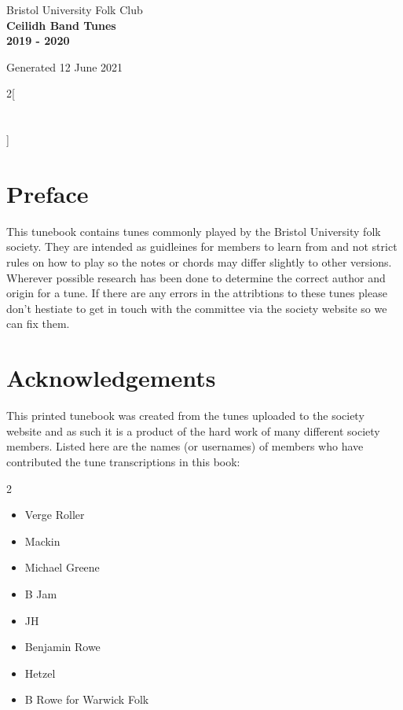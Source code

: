 \documentclass[12pt,a4paper,twoside]{article}
\makeatletter
\newcommand{\thetitle}{Ceilidh Band Tunes \\ \vspace{0.65cm} 2019 - 2020}
\newcommand{\thedate}{12 June 2021}
\renewcommand\tableofcontents{%
    \begin{multicols}{2}[
      \centering
      \section*{\large\contentsname
        \@mkboth{%
           \MakeUppercase\contentsname}{\MakeUppercase\contentsname}}]
    \@starttoc{toc}%
    \end{multicols}
}
\makeatother
\begin{document}
\begin{titlepage}
   \begin{center}
       \large Bristol University Folk Club \\

       \vspace{4cm}
       \textbf{\Huge \thetitle}

       \vspace{0.5cm}
       Generated \thedate

       \vspace{1.5cm}

       \vfill

   \end{center}
\end{titlepage}

\tableofcontents

\section{Preface}

This tunebook contains tunes commonly played by the Bristol University folk society. They are intended as guidleines for members to learn from and not strict rules on how to play so the notes or chords may differ slightly to other versions.
Wherever possible research has been done to determine the correct author and origin for a tune. If there are any errors in the attribtions to these tunes please don't hestiate to get in touch with the committee via the society website so we can fix them.

\section{Acknowledgements}

This printed tunebook was created from the tunes uploaded to the society website and as such it is a product of the hard work of many different society members. Listed here are the names (or usernames) of members who have contributed the tune transcriptions in this book:

\begin{multicols}{2}
\begin{itemize}\item Verge Roller
\item Mackin
\item Michael Greene
\item B Jam
\item JH
\item Benjamin Rowe
\item Hetzel
\item B Rowe for Warwick Folk
\end{itemize}

\end{multicols}
\end{document}
